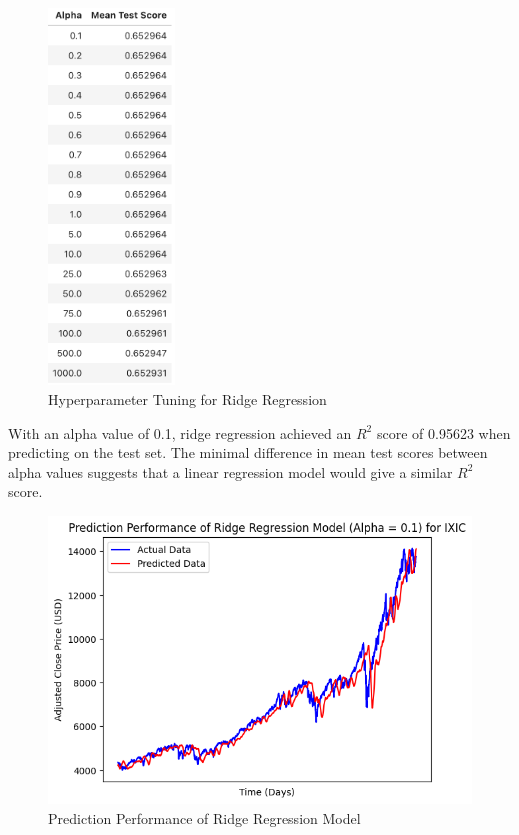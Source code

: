 \documentclass[a4paper, 11pt]{article}
\begin{document}
\begin{figure}[H]
    \begin{center}
        \includegraphics[width=0.3\textwidth]{Hyperparameter Tuning for Ridge Regression.png}
        \caption{Hyperparameter Tuning for Ridge Regression}
    \end{center}
\end{figure}

With an alpha value of 0.1, ridge regression achieved an $R^2$ score of 0.95623 when predicting on the test set. The minimal difference in mean test scores between alpha values suggests that a linear regression model would give a similar $R^2$ score.

\begin{figure}[H]
    \begin{center}
        \includegraphics[width=1\textwidth]{Prediction Performance of Ridge Regression Model.png}
        \caption{Prediction Performance of Ridge Regression Model}
    \end{center}
\end{figure}
\end{document}
